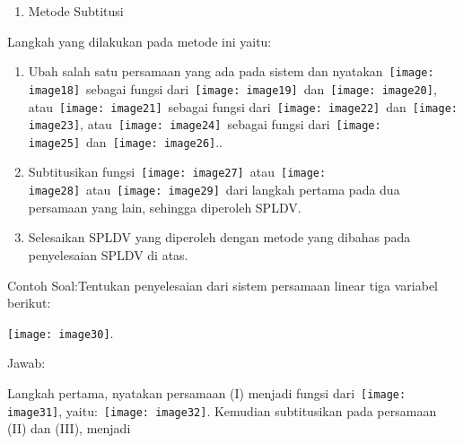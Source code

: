 \documentclass[11pt,fleqn]{book} %
\begin{document}
\begin{enumerate}
\item  Metode Subtitusi
\end{enumerate}

\noindent Langkah yang dilakukan pada metode ini yaitu:

\begin{enumerate}
\item  Ubah salah satu persamaan yang ada pada sistem dan nyatakan~\texttt{[image: image18]}~sebagai fungsi dari~\texttt{[image: image19]}~dan~\texttt{[image: image20]}, atau~\texttt{[image: image21]}~sebagai fungsi dari~\texttt{[image: image22]}~dan~\texttt{[image: image23]}, atau~\texttt{[image: image24]}~sebagai fungsi dari~\texttt{[image: image25]}~dan~\texttt{[image: image26]}..

\item  Subtitusikan fungsi~\texttt{[image: image27]}~atau~\texttt{[image: image28]}~atau~\texttt{[image: image29]}~dari langkah pertama pada dua persamaan yang lain, sehingga diperoleh SPLDV.

\item  Selesaikan SPLDV yang diperoleh dengan metode yang dibahas pada penyelesaian SPLDV di atas.
\end{enumerate}

\noindent Contoh Soal:Tentukan penyelesaian dari sistem persamaan linear tiga variabel berikut:

\noindent \texttt{[image: image30]}.

\noindent Jawab:

\noindent Langkah pertama, nyatakan persamaan (I) menjadi fungsi dari~\texttt{[image: image31]}, yaitu:~\texttt{[image: image32]}. Kemudian subtitusikan pada persamaan (II) dan (III), menjadi
\end{document}
